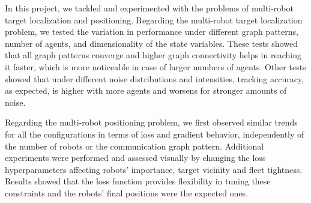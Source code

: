 \documentclass[a4paper,11pt,oneside]{book}
\begin{document}
In this project, we tackled and experimented with the problems of multi-robot target localization and positioning. Regarding the multi-robot target localization problem, we tested the variation in performance under different graph patterns, number of agents, and dimensionality of the state variables. These tests showed that all graph patterns converge and higher graph connectivity helps in reaching it faster, which is more noticeable in case of larger numbers of agents. Other tests showed that under different noise distributions and intensities, tracking accuracy, as expected, is higher with more agents and worsens for stronger amounts of noise.

Regarding the multi-robot positioning problem, we first observed similar trends for all the configurations in terms of loss and gradient behavior, independently of the number of robots or the communication graph pattern. Additional experiments were performed and assessed visually by changing the loss hyperparameters affecting robots' importance, target vicinity and fleet tightness. Results showed that the loss function provides flexibility in tuning these constraints and the robots' final positions were the expected ones.



\end{document}
